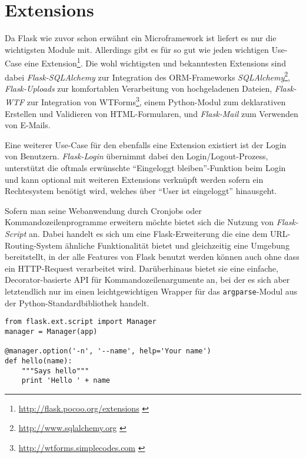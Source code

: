\section{Extensions}

Da Flask wie zuvor schon erwähnt ein Microframework ist liefert es nur die wichtigsten Module mit.
Allerdings gibt es für so gut wie jeden wichtigen Use-Case eine
Extension\footnote{\href{http://flask.pocoo.org/extensions}{http://flask.pocoo.org/extensions} \citep{flaskext}}.
Die wohl wichtigsten und bekanntesten Extensions sind dabei \emph{Flask-SQLAlchemy} zur Integration des
ORM-Frameworks
\emph{SQLAlchemy}\footnote{\href{http://www.sqlalchemy.org}{http://www.sqlalchemy.org} \citep{sqlalchemy}},
\emph{Flask-Uploads} zur komfortablen Verarbeitung von hochgeladenen Dateien, \emph{Flask-WTF} zur
Integration von
WTForms\footnote{\href{http://wtforms.simplecodes.com}{http://wtforms.simplecodes.com} \citep{wtforms}}, einem
Python-Modul zum deklarativen Erstellen und Validieren von HTML-Formularen, und \emph{Flask-Mail}
zum Verwenden von E-Mails.

Eine weiterer Use-Case für den ebenfalls eine Extension existiert ist der Login von Benutzern.
\emph{Flask-Login} übernimmt dabei den Login/Logout-Prozess, unterstützt die oftmals erwünschte
\enquote{Eingeloggt bleiben}-Funktion beim Login und kann optional mit weiteren Extensions verknüpft
werden sofern ein Rechtesystem benötigt wird, welches über \enquote{User ist eingeloggt} hinausgeht.

Sofern man seine Webanwendung durch Cronjobs oder Kommandozeilenprogramme erweitern möchte bietet
sich die Nutzung von \emph{Flask-Script} an. Dabei handelt es sich um eine Flask-Erweiterung die
eine dem URL-Routing-System ähnliche Funktionalität bietet und gleichzeitig eine Umgebung
bereitstellt, in der alle Features von Flask benutzt werden können auch ohne dass ein HTTP-Request
verarbeitet wird. Darüberhinaus bietet sie eine einfache, Decorator-basierte API für
Kommandozeilenargumente an, bei der es sich aber letztendlich nur im einen leichtgewichtigen Wrapper
für das \lstinline{argparse}-Modul aus der Python-Standardbibliothek handelt.

\begin{lstlisting}[caption=Flask-Script]
from flask.ext.script import Manager
manager = Manager(app)

@manager.option('-n', '--name', help='Your name')
def hello(name):
    """Says hello"""
    print 'Hello ' + name
\end{lstlisting}

